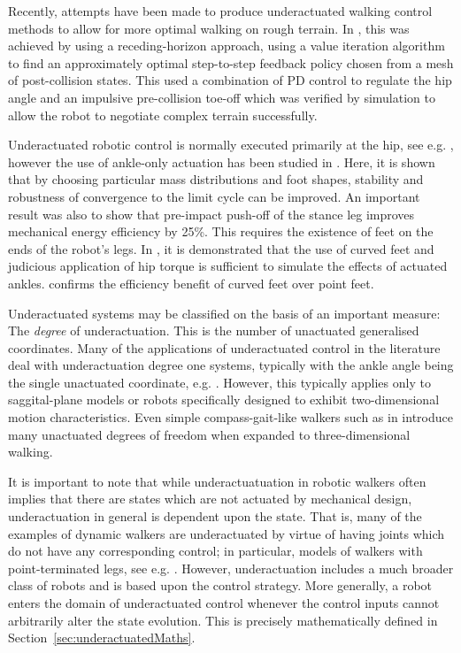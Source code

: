 Recently, attempts have been made to produce underactuated walking control methods to allow for more optimal walking on rough terrain. In \cite{byl2008approximate}, this was achieved by using a receding-horizon approach, using a value iteration algorithm \cite{sutton1998introduction} to find an approximately optimal step-to-step feedback policy chosen from a mesh of post-collision states. This used a combination of PD control to regulate the hip angle and an impulsive pre-collision toe-off which was verified by simulation to allow the robot to negotiate complex terrain successfully.

Underactuated robotic control is normally executed primarily at the hip, see e.g. \cite{tedrake2004actuating, byl2008approximate, manchester2011stable}, however the use of ankle-only actuation has been studied in \cite{franken2008analysis}. Here, it is shown that by choosing particular mass distributions and foot shapes, stability and robustness of convergence to the limit cycle can be improved. An important result was also to show that pre-impact push-off of the stance leg improves mechanical energy efficiency by 25\%. This requires the existence of feet on the ends of the robot's legs. In \cite{asano2007dynamic}, it is demonstrated that the use of curved feet and judicious application of hip torque is sufficient to simulate the effects of actuated ankles. \cite{martin2014design} confirms the efficiency benefit of curved feet over point feet.

Underactuated systems may be classified on the basis of an important measure: The \textit{degree} of underactuation. This is the number of unactuated generalised coordinates. Many of the applications of underactuated control in the literature deal with underactuation degree one systems, typically with the ankle angle being the single unactuated coordinate, e.g. \cite{byl2008approximate, westervelt2003hybrid}. However, this typically applies only to saggital-plane models or robots specifically designed to exhibit two-dimensional motion characteristics. Even simple compass-gait-like walkers such as in \cite{tedrake2004actuating} introduce many unactuated degrees of freedom when expanded to three-dimensional walking.

It is important to note that while underactuatuation in robotic walkers often implies that there are states which are not actuated by mechanical design, underactuation in general is dependent upon the state. That is, many of the examples of dynamic walkers are underactuated by virtue of having joints which do not have any corresponding control; in particular, models of walkers with point-terminated legs, see e.g. \cite{westervelt2003hybrid}. However, underactuation includes a much broader class of robots and is based upon the control strategy. More generally, a robot enters the domain of underactuated control whenever the control inputs cannot arbitrarily alter the state evolution. This is precisely mathematically defined in Section~\ref{sec:underactuatedMaths}.

